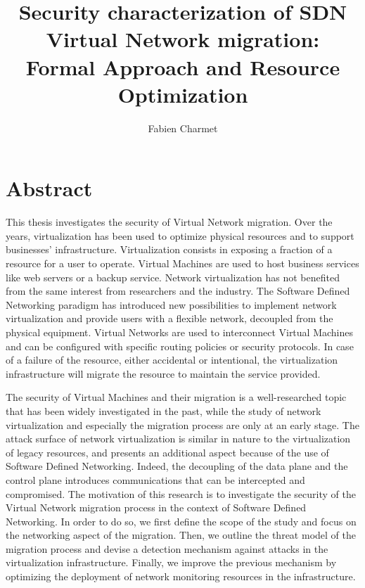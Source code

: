 \documentclass[a4paper, 11pt]{report}
\title{\LARGE \bf Security characterization of SDN Virtual Network migration:\\ Formal Approach and Resource Optimization}
\author{Fabien Charmet}
\theoremstyle{definition}
\begin{document}
% 

\maketitle
\chapter*{Abstract}
This thesis investigates the security of Virtual Network migration. Over the years, virtualization has been used to optimize physical resources and to support businesses’ infrastructure. Virtualization consists in exposing a fraction of a resource for a user to operate. Virtual Machines are used to host business services like web servers or a backup service. Network virtualization has not benefited from the same interest from researchers and the industry. The Software Defined Networking paradigm has introduced new possibilities to implement network virtualization and provide users with a flexible network, decoupled from the physical equipment. Virtual Networks are used to interconnect Virtual Machines and can be configured with specific routing policies or security protocols. In case of a failure of the resource, either accidental or intentional, the virtualization infrastructure will migrate the resource to maintain the service provided.

The security of Virtual Machines and their migration is a well-researched topic that has been widely investigated in the past, while the study of network virtualization and especially the migration process are only at an early stage. The attack surface of network virtualization is similar in nature to the virtualization of legacy resources, and presents an additional aspect because of the use of Software Defined Networking. Indeed, the decoupling of the data plane and the control plane introduces communications that can be intercepted and compromised.
The motivation of this research is to investigate the security of the Virtual Network migration process in the context of Software Defined Networking. In order to do so, we first define the scope of the study and focus on the networking aspect of the migration. Then, we outline the threat model of the migration process and devise a detection mechanism against attacks in the virtualization infrastructure. Finally, we improve the previous mechanism by optimizing the deployment of network monitoring resources in the infrastructure.
    
\end{document}
